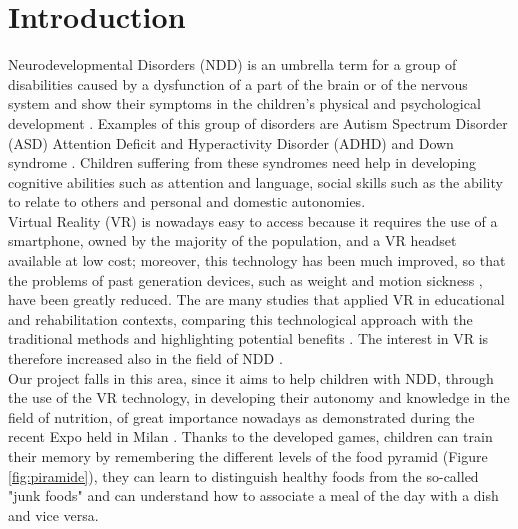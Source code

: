 \documentclass{sigchi-ext}
\begin{document}
\section{Introduction}
Neurodevelopmental Disorders (NDD) is an umbrella term for a group of disabilities caused by a dysfunction of a part of the brain or of the nervous system and show their symptoms in the children’s physical and psychological development \cite{rif1}. Examples of this group of disorders are Autism Spectrum Disorder (ASD) Attention Deficit and Hyperactivity Disorder (ADHD) and Down syndrome \cite{rif2}. Children suffering from these syndromes need help in developing cognitive abilities such as attention and language, social skills such as the ability to relate to others and personal and domestic autonomies.
\\
\medskip
Virtual Reality (VR) is nowadays easy to access because it requires the use of a smartphone, owned by the majority of the population, and a VR headset available at low cost; moreover, this technology has been much improved, so that the problems of past generation devices, such as weight and motion sickness \cite{rif6}, have been greatly reduced. The are many studies that applied VR in educational and rehabilitation contexts, comparing this technological approach with the traditional methods and highlighting potential benefits \cite{rif3} \cite{rif4} \cite{rif5}. The interest in VR is therefore increased also in the field of NDD \cite{rif7} \cite{rif8}.
\\
\medskip
Our project falls in this area, since it aims to help children with NDD, through the use of the VR technology, in developing their autonomy and knowledge in the field of nutrition, of great importance nowadays as demonstrated during the recent Expo held in Milan \cite{rif9}.
Thanks to the developed games, children can train their memory by remembering the different levels of the food pyramid (Figure \ref{fig:piramide}), they can learn to distinguish healthy foods from the so-called "junk foods" and can understand how to associate a meal of the day with a dish and vice versa.
\end{document}
